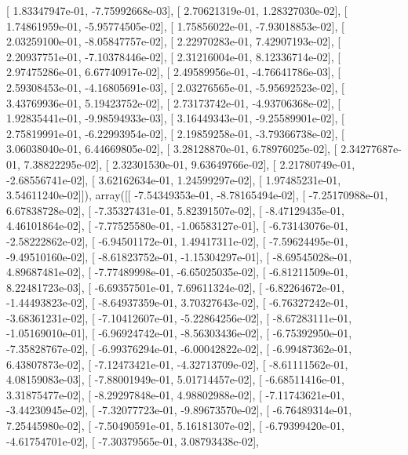 \documentclass{article}
\begin{document}
       [  1.83347947e-01,  -7.75992668e-03],
       [  2.70621319e-01,   1.28327030e-02],
       [  1.74861959e-01,  -5.95774505e-02],
       [  1.75856022e-01,  -7.93018853e-02],
       [  2.03259100e-01,  -8.05847757e-02],
       [  2.22970283e-01,   7.42907193e-02],
       [  2.20937751e-01,  -7.10378446e-02],
       [  2.31216004e-01,   8.12336714e-02],
       [  2.97475286e-01,   6.67740917e-02],
       [  2.49589956e-01,  -4.76641786e-03],
       [  2.59308453e-01,  -4.16805691e-03],
       [  2.03276565e-01,  -5.95692523e-02],
       [  3.43769936e-01,   5.19423752e-02],
       [  2.73173742e-01,  -4.93706368e-02],
       [  1.92835441e-01,  -9.98594933e-03],
       [  3.16449343e-01,  -9.25589901e-02],
       [  2.75819991e-01,  -6.22993954e-02],
       [  2.19859258e-01,  -3.79366738e-02],
       [  3.06038040e-01,   6.44669805e-02],
       [  3.28128870e-01,   6.78976025e-02],
       [  2.34277687e-01,   7.38822295e-02],
       [  2.32301530e-01,   9.63649766e-02],
       [  2.21780749e-01,  -2.68556741e-02],
       [  3.62162634e-01,   1.24599297e-02],
       [  1.97485231e-01,   3.54611240e-02]]), array([[ -7.54349353e-01,  -8.78165494e-02],
       [ -7.25170988e-01,   6.67838728e-02],
       [ -7.35327431e-01,   5.82391507e-02],
       [ -8.47129435e-01,   4.46101864e-02],
       [ -7.77525580e-01,  -1.06583127e-01],
       [ -6.73143076e-01,  -2.58222862e-02],
       [ -6.94501172e-01,   1.49417311e-02],
       [ -7.59624495e-01,  -9.49510160e-02],
       [ -8.61823752e-01,  -1.15304297e-01],
       [ -8.69545028e-01,   4.89687481e-02],
       [ -7.77489998e-01,  -6.65025035e-02],
       [ -6.81211509e-01,   8.22481723e-03],
       [ -6.69357501e-01,   7.69611324e-02],
       [ -6.82264672e-01,  -1.44493823e-02],
       [ -8.64937359e-01,   3.70327643e-02],
       [ -6.76327242e-01,  -3.68361231e-02],
       [ -7.10412607e-01,  -5.22864256e-02],
       [ -8.67283111e-01,  -1.05169010e-01],
       [ -6.96924742e-01,  -8.56303436e-02],
       [ -6.75392950e-01,  -7.35828767e-02],
       [ -6.99376294e-01,  -6.00042822e-02],
       [ -6.99487362e-01,   6.43807873e-02],
       [ -7.12473421e-01,  -4.32713709e-02],
       [ -8.61111562e-01,   4.08159083e-03],
       [ -7.88001949e-01,   5.01714457e-02],
       [ -6.68511416e-01,   3.31875477e-02],
       [ -8.29297848e-01,   4.98802988e-02],
       [ -7.11743621e-01,  -3.44230945e-02],
       [ -7.32077723e-01,  -9.89673570e-02],
       [ -6.76489314e-01,   7.25445980e-02],
       [ -7.50490591e-01,   5.16181307e-02],
       [ -6.79399420e-01,  -4.61754701e-02],
       [ -7.30379565e-01,   3.08793438e-02],
\end{document}
